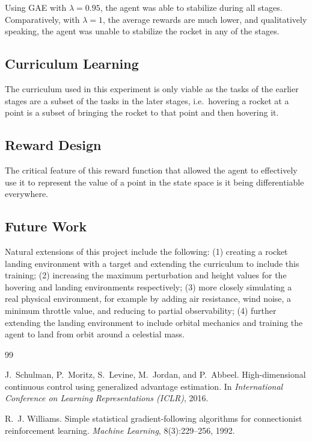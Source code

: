 \documentclass{article}
\begin{document}
Using GAE with $\lambda = 0.95$, the agent was able to stabilize during all stages. Comparatively, with $\lambda = 1$, the average rewards are much lower, and qualitatively speaking, the agent was unable to stabilize the rocket in any of the stages.

\subsection{Curriculum Learning}

The curriculum used in this experiment is only viable as the tasks of the earlier stages are a subset of the tasks in the later stages, i.e.\ hovering a rocket at a point is a subset of bringing the rocket to that point and then hovering it.

\subsection{Reward Design}

The critical feature of this reward function that allowed the agent to effectively use it to represent the value of a point in the state space is it being differentiable everywhere.

\subsection{Future Work}

Natural extensions of this project include the following: (1) creating a rocket landing environment with a target and extending the curriculum to include this training; (2) increasing the maximum perturbation and height values for the hovering and landing environments respectively; (3) more closely simulating a real physical environment, for example by adding air resistance, wind noise, a minimum throttle value, and reducing to partial observability; (4) further extending the landing environment to include orbital mechanics and training the agent to land from orbit around a celestial mass.


\begin{thebibliography}{99}

J.~Schulman, P.~Moritz, S.~Levine, M.~Jordan, and P.~Abbeel.
\newblock High-dimensional continuous control using generalized advantage estimation.
\newblock In \emph{International Conference on Learning Representations (ICLR)}, 2016.

R.~J. Williams.
\newblock Simple statistical gradient-following algorithms for connectionist reinforcement learning.
\newblock \emph{Machine Learning}, 8(3):229--256, 1992.

\end{thebibliography}
\end{document}
